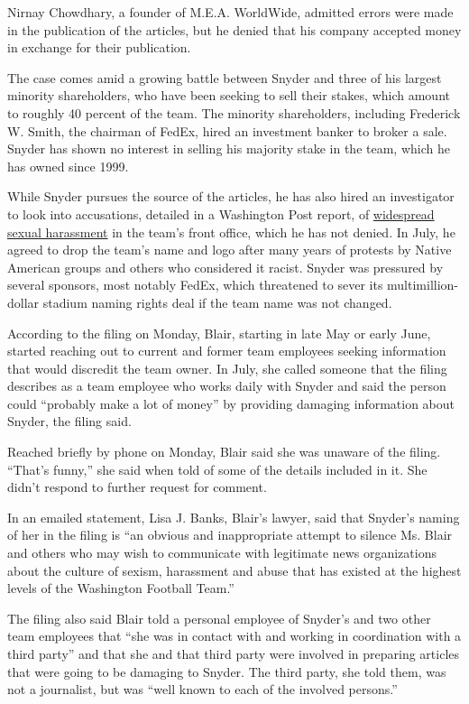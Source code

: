 Nirnay Chowdhary, a founder of M.E.A. WorldWide, admitted errors were
made in the publication of the articles, but he denied that his company
accepted money in exchange for their publication.

The case comes amid a growing battle between Snyder and three of his
largest minority shareholders, who have been seeking to sell their
stakes, which amount to roughly 40 percent of the team. The minority
shareholders, including Frederick W. Smith, the chairman of FedEx, hired
an investment banker to broker a sale. Snyder has shown no interest in
selling his majority stake in the team, which he has owned since 1999.

While Snyder pursues the source of the articles, he has also hired an
investigator to look into accusations, detailed in a Washington Post
report, of
\href{https://www.nytimes3xbfgragh.onion/2020/07/16/sports/football/washington-sexual-assault-harassment-dan-snyder.html}{widespread
sexual harassment} in the team's front office, which he has not denied.
In July, he agreed to drop the team's name and logo after many years of
protests by Native American groups and others who considered it racist.
Snyder was pressured by several sponsors, most notably FedEx, which
threatened to sever its multimillion-dollar stadium naming rights deal
if the team name was not changed.

According to the filing on Monday, Blair, starting in late May or early
June, started reaching out to current and former team employees seeking
information that would discredit the team owner. In July, she called
someone that the filing describes as a team employee who works daily
with Snyder and said the person could ``probably make a lot of money''
by providing damaging information about Snyder, the filing said.

Reached briefly by phone on Monday, Blair said she was unaware of the
filing. ``That's funny,'' she said when told of some of the details
included in it. She didn't respond to further request for comment.

In an emailed statement, Lisa J. Banks, Blair's lawyer, said that
Snyder's naming of her in the filing is ``an obvious and inappropriate
attempt to silence Ms. Blair and others who may wish to communicate with
legitimate news organizations about the culture of sexism, harassment
and abuse that has existed at the highest levels of the Washington
Football Team.''

The filing also said Blair told a personal employee of Snyder's and two
other team employees that ``she was in contact with and working in
coordination with a third party'' and that she and that third party were
involved in preparing articles that were going to be damaging to Snyder.
The third party, she told them, was not a journalist, but was ``well
known to each of the involved persons.''


